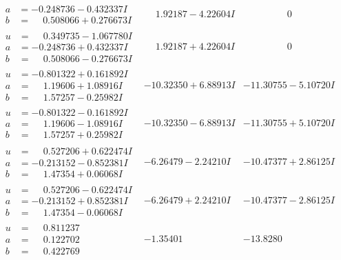 \documentclass[1p]{elsarticle_modified}
\theoremstyle{definition}
\begin{document}
$$\begin{array}{c|c|c}
\begin{aligned}
a &= -0.248736 - 0.432337 I \\
b &= \phantom{-}0.508066 + 0.276673 I\end{aligned}
 & \phantom{-}1.92187 - 4.22604 I & \phantom{-0.000000 } 0 \\ \hline\begin{aligned}
u &= \phantom{-}0.349735 - 1.067780 I \\
a &= -0.248736 + 0.432337 I \\
b &= \phantom{-}0.508066 - 0.276673 I\end{aligned}
 & \phantom{-}1.92187 + 4.22604 I & \phantom{-0.000000 } 0 \\ \hline\begin{aligned}
u &= -0.801322 + 0.161892 I \\
a &= \phantom{-}1.19606 + 1.08916 I \\
b &= \phantom{-}1.57257 - 0.25982 I\end{aligned}
 & -10.32350 + 6.88913 I & -11.30755 - 5.10720 I \\ \hline\begin{aligned}
u &= -0.801322 - 0.161892 I \\
a &= \phantom{-}1.19606 - 1.08916 I \\
b &= \phantom{-}1.57257 + 0.25982 I\end{aligned}
 & -10.32350 - 6.88913 I & -11.30755 + 5.10720 I \\ \hline\begin{aligned}
u &= \phantom{-}0.527206 + 0.622474 I \\
a &= -0.213152 - 0.852381 I \\
b &= \phantom{-}1.47354 + 0.06068 I\end{aligned}
 & -6.26479 - 2.24210 I & -10.47377 + 2.86125 I \\ \hline\begin{aligned}
u &= \phantom{-}0.527206 - 0.622474 I \\
a &= -0.213152 + 0.852381 I \\
b &= \phantom{-}1.47354 - 0.06068 I\end{aligned}
 & -6.26479 + 2.24210 I & -10.47377 - 2.86125 I \\ \hline\begin{aligned}
u &= \phantom{-}0.811237\phantom{ +0.000000I} \\
a &= \phantom{-}0.122702\phantom{ +0.000000I} \\
b &= \phantom{-}0.422769\phantom{ +0.000000I}\end{aligned}
 & -1.35401\phantom{ +0.000000I} & -13.8280\phantom{ +0.000000I} \\ \hline\begin{aligned}

\end{aligned}
\end{array}$$
\end{document}
